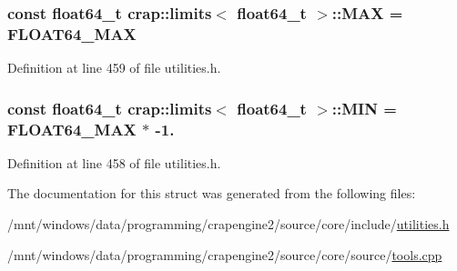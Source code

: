 \subsubsection[{M\+A\+X}]{\setlength{\rightskip}{0pt plus 5cm}const {\bf float64\+\_\+t} {\bf crap\+::limits}$<$ {\bf float64\+\_\+t} $>$\+::M\+A\+X = {\bf F\+L\+O\+A\+T64\+\_\+\+M\+A\+X}\hspace{0.3cm}{\ttfamily [static]}}\label{structcrap_1_1limits_3_01float64__t_01_4_ac27ede6a3bbe14baeb6a1c00e51d9455}


Definition at line 459 of file utilities.\+h.

\hypertarget{structcrap_1_1limits_3_01float64__t_01_4_a5d1630d9dd3b33fbbb2ef0d1fe181fa2}{}
\subsubsection[{M\+I\+N}]{\setlength{\rightskip}{0pt plus 5cm}const {\bf float64\+\_\+t} {\bf crap\+::limits}$<$ {\bf float64\+\_\+t} $>$\+::M\+I\+N = {\bf F\+L\+O\+A\+T64\+\_\+\+M\+A\+X} $\ast$ -\/1.\hspace{0.3cm}{\ttfamily [static]}}\label{structcrap_1_1limits_3_01float64__t_01_4_a5d1630d9dd3b33fbbb2ef0d1fe181fa2}


Definition at line 458 of file utilities.\+h.



The documentation for this struct was generated from the following files\+:\begin{DoxyCompactItemize}
\item 
/mnt/windows/data/programming/crapengine2/source/core/include/\hyperlink{utilities_8h}{utilities.\+h}\item 
/mnt/windows/data/programming/crapengine2/source/core/source/\hyperlink{tools_8cpp}{tools.\+cpp}\end{DoxyCompactItemize}
